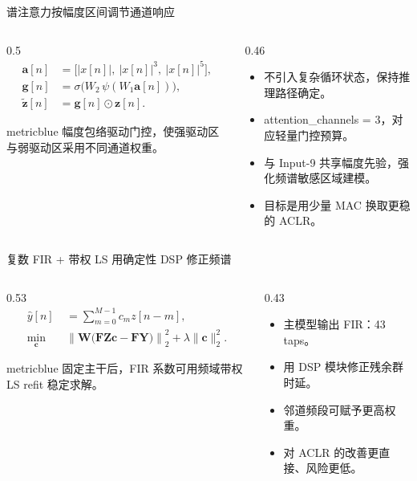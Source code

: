 \documentclass[20pt, cjk, slidetop, table]{beamer}
\begin{document}
\begin{frame}{谱注意力按幅度区间调节通道响应}
  \begin{columns}[T,onlytextwidth]
    \begin{column}{0.5\linewidth}
      \begin{align*}
        \mathbf{a}[n] &= \big[|x[n]|,\ |x[n]|^3,\ |x[n]|^5\big],\\
        \mathbf{g}[n] &= \sigma\big(W_2\,\psi(W_1\mathbf{a}[n])\big),\\
        \widetilde{\mathbf{z}}[n] &= \mathbf{g}[n]\odot \mathbf{z}[n].
      \end{align*}
      \begin{beamercolorbox}[wd=\linewidth,sep=0.8em]{metricblue}
        幅度包络驱动门控，使强驱动区与弱驱动区采用不同通道权重。
      \end{beamercolorbox}
    \end{column}
    \begin{column}{0.46\linewidth}
      \begin{itemize}
        \item 不引入复杂循环状态，保持推理路径确定。
        \item attention\_channels = 3，对应轻量门控预算。
        \item 与 Input-9 共享幅度先验，强化频谱敏感区域建模。
        \item 目标是用少量 MAC 换取更稳的 ACLR。
      \end{itemize}
    \end{column}
  \end{columns}
\end{frame}

\begin{frame}{复数 FIR + 带权 LS 用确定性 DSP 修正频谱}
  \begin{columns}[T,onlytextwidth]
    \begin{column}{0.53\linewidth}
      \begin{align*}
        \widehat{y}[n] &= \sum_{m=0}^{M-1} c_m z[n-m],\\
        \min_{\mathbf{c}}\quad
        &\left\|\mathbf{W}\big(\mathbf{FZc}-\mathbf{FY}\big)\right\|_2^2
        + \lambda\|\mathbf{c}\|_2^2 .
      \end{align*}
      \begin{beamercolorbox}[wd=\linewidth,sep=0.8em]{metricblue}
        固定主干后，FIR 系数可用频域带权 LS refit 稳定求解。
      \end{beamercolorbox}
    \end{column}
    \begin{column}{0.43\linewidth}
      \begin{itemize}
        \item 主模型输出 FIR：43 taps。
        \item 用 DSP 模块修正残余群时延。
        \item 邻道频段可赋予更高权重。
        \item 对 ACLR 的改善更直接、风险更低。
      \end{itemize}
    \end{column}
  \end{columns}
\end{frame}
\end{document}

